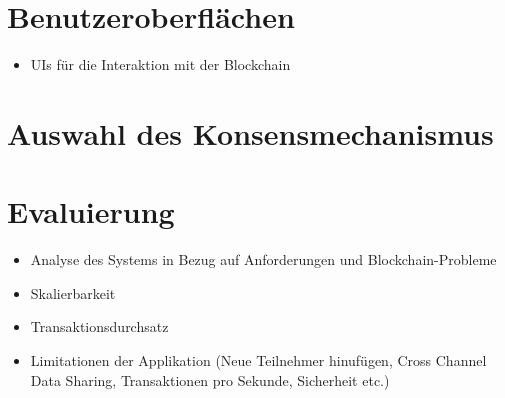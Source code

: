 \section{Benutzeroberflächen}
\begin{itemize}
    \item UIs für die Interaktion mit der Blockchain
\end{itemize}

\section{Auswahl des Konsensmechanismus}



\section{Evaluierung}
\begin{itemize}
    \item Analyse des Systems in Bezug auf Anforderungen und Blockchain-Probleme
    \item Skalierbarkeit
    \item Transaktionsdurchsatz
    \item Limitationen der Applikation (Neue Teilnehmer hinufügen, Cross Channel Data Sharing, Transaktionen pro Sekunde, Sicherheit etc.)
\end{itemize}



